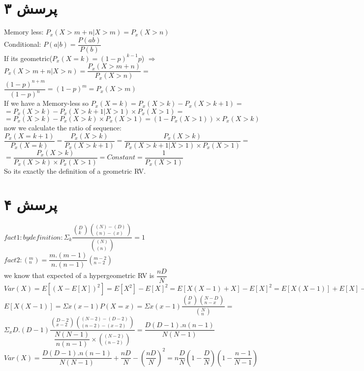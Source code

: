 \documentclass[a4paper]{article}
\begin{document}
\section*{پرسش ۳}
\begin{latin}
Memory less: $P_x(X>m+n | X>m) = P_x(X>n)$\\
Conditional: $P(a|b) = \dfrac{P(ab)}{P(b)}$\\
If its geometric($P_x(X=k)=(1-p)^{k-1}p$) $ \Rightarrow $\\
$P_x(X>m+n|X>n) = \dfrac{P_x(X>m+n)}{P_x(X>n)} =$
$\dfrac{(1-p)^{n+m}}{(1-p)^n} = (1-p)^m = P_x(X>m)$\\

If we have a Memory-less so $P_x(X=k) = P_x(X>k) - P_x(X>k+1)=$\\
$= P_x(X>k) - P_x(X>k+1|X>1)\times P_x(X>1) = $\\
$= P_x(X>k) - P_x(X>k)\times P_x(X>1) = (1-P_x(X>1)) \times P_x(X>k)$\\
now we calculate the ratio of sequence:$\dfrac{P_x(X=k+1)}{P_x(X=k)} = \dfrac{P_x(X>k)}{P_x(X>k+1)}=\dfrac{P_x(X>k)}{P_x(X>k+1|X>1)\times P_x(X>1)} =$\\
$=\dfrac{P_x(X>k)}{P_x(X>k)\times P_x(X>1)} = Constant = \dfrac{1}{P_x(X>1)}$\\ 
So its exactly the definition of a geometric RV.


\end{latin}
\pagebreak

\section*{پرسش ۴}
\begin{latin}
$ fact1: by definition:  \Sigma_k \dfrac{(_{k}^{D})(_{(n)-(x)}^{(N)-(D)})}{(_{(n)}^{(N)})} = 1$\\
$ fact2: (_n^m) = \dfrac{m.(m-1)}{n.(n-1)} (_{n-2}^{m-2})$\\
we know that expected of a hypergeometric RV  is $ \dfrac{nD}{N} $\\
$Var(X) = E[(X-E[X])^2] = E[X^2] - E[X]^2 = E[X(X-1) + X] - E[X]^2 = E[X(X-1)] + E[X] - E[X]^2 $\\
$E[X(X-1)] = \Sigma x(x-1)P(X=x) = \Sigma x(x-1) \dfrac{(_x^D)(_{n-x}^{N-D})}{(_n^N)} = $\\
$ \Sigma_x D.(D-1) \dfrac{(_{x-2}^{D-2})(_{(n-2)-(x-2)}^{(N-2)-(D-2)})}{\dfrac{N(N-1)}{n(n-1)}\times (_{(n-2)}^{(N-2)})} = \dfrac{D(D-1).n(n-1)}{N(N-1)}$\\
$Var(X) = \dfrac{D(D-1).n(n-1)}{N(N-1)} + \dfrac{nD}{N} - (\dfrac{nD}{N})^2 = n\dfrac{D}{N}(1-\dfrac{D}{N})(1-\dfrac{n-1}{N-1})$

\end{latin}
\pagebreak
\end{document}
